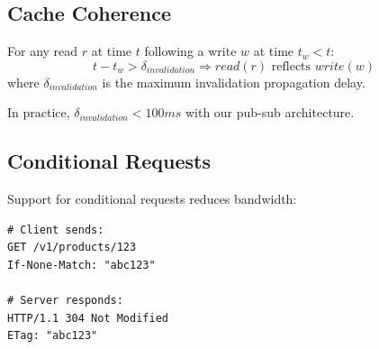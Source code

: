 \subsection{Cache Coherence}

\begin{theorem}
For any read $r$ at time $t$ following a write $w$ at time $t_w < t$:
\begin{equation}
t - t_w > \delta_{invalidation} \Rightarrow read(r) \text{ reflects } write(w)
\end{equation}
where $\delta_{invalidation}$ is the maximum invalidation propagation delay.
\end{theorem}

In practice, $\delta_{invalidation} < 100ms$ with our pub-sub architecture.

\subsection{Conditional Requests}

Support for conditional requests reduces bandwidth:

\begin{lstlisting}[caption=Conditional Request]
# Client sends:
GET /v1/products/123
If-None-Match: "abc123"

# Server responds:
HTTP/1.1 304 Not Modified
ETag: "abc123"
\end{lstlisting}

